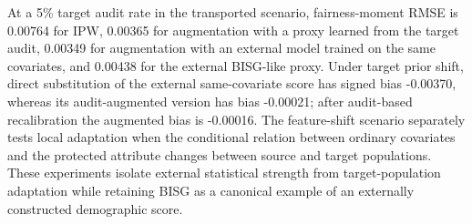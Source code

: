 At a 5\% target audit rate in the transported scenario, fairness-moment RMSE is 0.00764 for IPW, 0.00365 for augmentation with a proxy learned from the target audit, 0.00349 for augmentation with an external model trained on the same covariates, and 0.00438 for the external BISG-like proxy. Under target prior shift, direct substitution of the external same-covariate score has signed bias -0.00370, whereas its audit-augmented version has bias -0.00021; after audit-based recalibration the augmented bias is -0.00016. The feature-shift scenario separately tests local adaptation when the conditional relation between ordinary covariates and the protected attribute changes between source and target populations. These experiments isolate external statistical strength from target-population adaptation while retaining BISG as a canonical example of an externally constructed demographic score.


